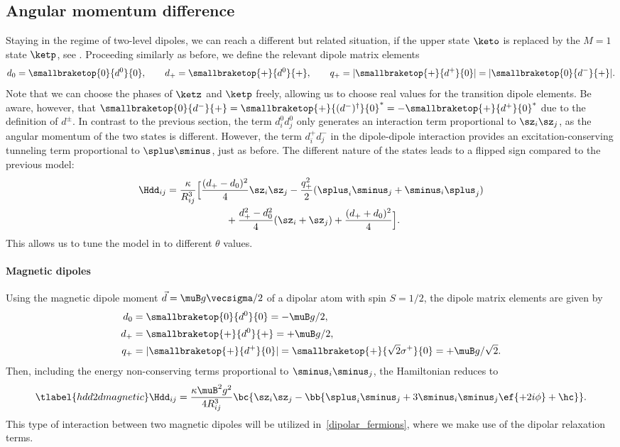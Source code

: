 \subsection{Angular momentum difference}
Staying in the regime of two-level dipoles, we can reach a different but related situation, if the upper state $\keto$ is replaced by the $M=1$ state $\ketp$, see .
Proceeding similarly as before, we define the relevant dipole matrix elements
\begin{align}
    d_0 = \smallbraketop{0}{d^0}{0},\qquad
    d_+ = \smallbraketop{+}{d^0}{+},\qquad
    q_+ = |\smallbraketop{+}{d^+}{0}| = |\smallbraketop{0}{d^-}{+}|.
\end{align}
Note that we can choose the phases of $\ketz$ and $\ketp$ freely, allowing us to choose real values for the transition dipole elements. Be aware, however, that $\smallbraketop{0}{d^-}{+} = \smallbraketop{+}{(d^-)^\dag}{0}^* = -\smallbraketop{+}{d^+}{0}^*$ due to the definition of $d^\pm$.
In contrast to the previous section, the term $d^0_i d^0_j$ only generates an interaction term proportional to $\sz_i \sz_j$, as the angular momentum of the two states is different. However, the term $d^+_i d^-_j$ in the dipole-dipole interaction provides an excitation-conserving tunneling term proportional to $\splus\sminus$, just as before. The different nature of the states leads to a flipped sign compared to the previous model:
\begin{align}
    \Hdd_{ij} &= \frac{\kappa}{R_{ij}^3} \Big[ \frac{(d_+-d_0)^2}{4} \sz_i \sz_j  - \frac{q_+^2}{2} (\splus_i \sminus_j + \sminus_i \splus_j) \\
              &\qquad\qquad\qquad + \frac{d_+^2 - d_0^2}{4} (\sz_i + \sz_j)  + \frac{(d_++d_0)^2}{4} \Big].
\end{align}
This allows us to tune the model in  to different $\theta$ values.

\paragraph{Magnetic dipoles}
Using the magnetic dipole moment $\vec{d}=\muB g \vecsigma / 2$ of a dipolar atom with spin $S=1/2$,
the dipole matrix elements are given by
\begin{align}
    d_0 &= \smallbraketop{0}{d^0}{0} = -\muB g/2, \vphantom{\sqrt{2}} \\
    d_+ &= \smallbraketop{+}{d^0}{+} = +\muB g/2, \vphantom{\sqrt{2}} \\
    q_+ &= |\smallbraketop{+}{d^+}{0}| = \smallbraketop{+}{\sqrt{2} \sigma^+}{0} = +\muB g/\sqrt{2}.
\end{align}
Then, including the energy non-conserving terms proportional to $\sminus_i\sminus_j$, the Hamiltonian reduces to
\begin{align} \tlabel{hdd2dmagnetic}
    \Hdd_{ij} = \frac{\kappa \muB^2 g^2}{4 R_{ij}^3} \bc{ \sz_i \sz_j - \bb{\splus_i \sminus_j+ 3 \sminus_i\sminus_j \ef{+2i\phi} + \hc } }.
\end{align}
This type of interaction between two magnetic dipoles will be utilized in~\cref{dipolar_fermions}, where we make use of the dipolar relaxation terms.



